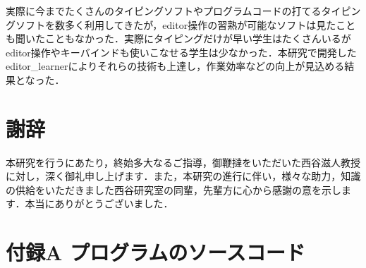 \documentclass[11pt,dvipdfmx]{jsarticle}
\begin{document}
実際に今までたくさんのタイピングソフトやプログラムコードの打てるタイピングソフトを数多く利用してきたが，editor操作の習熟が可能なソフトは見たことも聞いたこともなかった．実際にタイピングだけが早い学生はたくさんいるがeditor操作やキーバインドも使いこなせる学生は少なかった．本研究で開発したeditor\_learnerによりそれらの技術も上達し，作業効率などの向上が見込める結果となった．

    \section{謝辞}\label{ux8b1dux8f9e}

本研究を行うにあたり，終始多大なるご指導，御鞭撻をいただいた西谷滋人教授に対し，深く御礼申し上げます．また，本研究の進行に伴い，様々な助力，知識の供給をいただきました西谷研究室の同輩，先輩方に心から感謝の意を示します．本当にありがとうございました．

    \section{付録A
プログラムのソースコード}\label{ux4ed8ux9332a-ux30d7ux30edux30b0ux30e9ux30e0ux306eux30bdux30fcux30b9ux30b3ux30fcux30c9}
\end{document}
